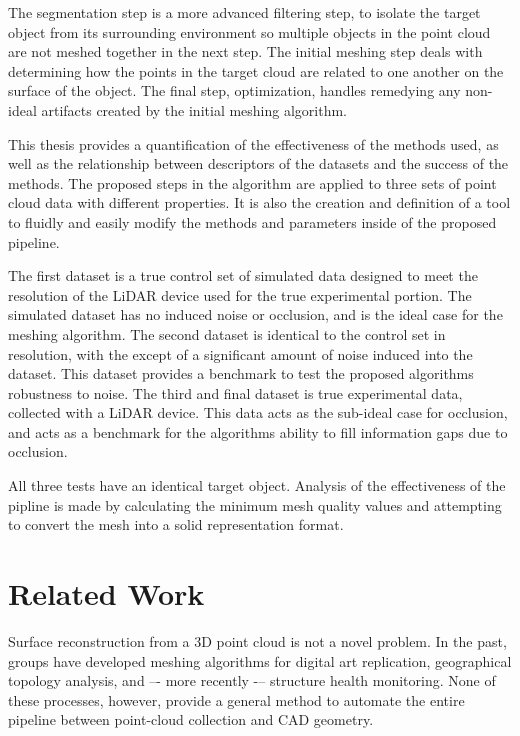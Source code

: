 \documentclass[12pt]{drexelthesis}
\let\Oldsection\section
\renewcommand{\section}{\FloatBarrier\Oldsection}
\begin{document}
The segmentation step is a more advanced filtering step, to isolate the target object from its surrounding environment so multiple objects in the point cloud are not meshed together in the next step. The initial meshing step deals with determining how the points in the target cloud are related to one another on the surface of the object. The final step, optimization, handles remedying any non-ideal artifacts created by the initial meshing algorithm.

This thesis provides a quantification of the effectiveness of the methods used, as well as the relationship between descriptors of the datasets and  the success of the methods. The proposed steps in the algorithm are applied to three sets of point cloud data with different properties. It is also the creation and definition of a tool to fluidly and easily modify the methods and parameters inside of the proposed pipeline.

The first dataset is a true control set of simulated data designed to meet the resolution of the LiDAR device used for the true experimental portion. The simulated dataset has no induced noise or occlusion, and is the ideal case for the meshing algorithm. The second dataset is identical to the control set in resolution, with the except of a significant amount of noise induced into the dataset. This dataset provides a benchmark to test the proposed algorithms robustness to noise. The third and final dataset is true experimental data, collected with a LiDAR device. This data acts as the sub-ideal case for occlusion, and acts as a benchmark for the algorithms ability to fill information gaps due to occlusion.

All three tests have an identical target object. Analysis of the effectiveness of the pipline is made by calculating the minimum mesh quality values and attempting to convert the mesh into a solid representation format. 

\section{Related Work}
\label{sec:related}
Surface reconstruction from a 3D point cloud is not a novel problem. In the past, groups have developed meshing algorithms for digital art replication, geographical topology analysis, and –- more recently -– structure health monitoring. None of these processes, however, provide a general method to automate the entire pipeline between point-cloud collection and CAD geometry.
\end{document}

